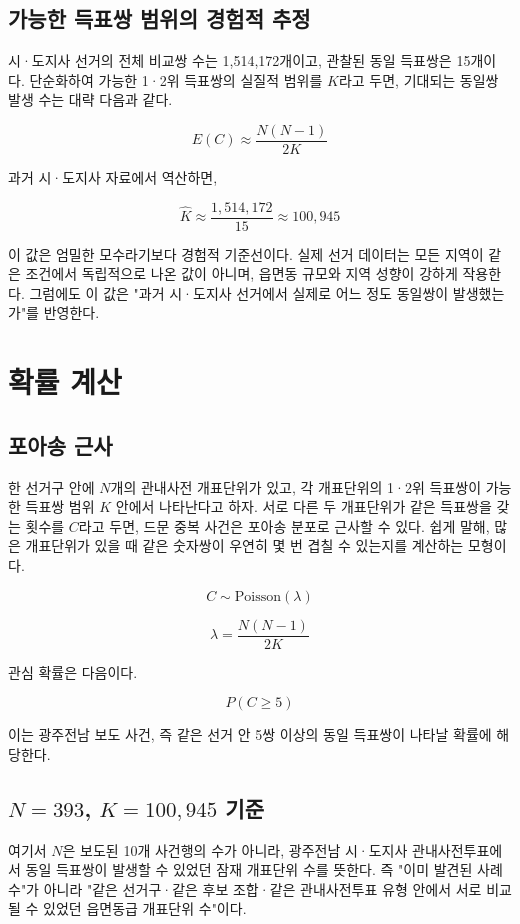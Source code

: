 \documentclass[preprint]{IEIE}
\begin{document}
\subsection{가능한 득표쌍 범위의 경험적 추정}

시·도지사 선거의 전체 비교쌍 수는 1,514,172개이고, 관찰된 동일 득표쌍은 15개이다. 단순화하여 가능한 1·2위 득표쌍의 실질적 범위를 \(K\)라고 두면, 기대되는 동일쌍 발생 수는 대략 다음과 같다.

\[
E(C) \approx \frac{N(N-1)}{2K}
\]

과거 시·도지사 자료에서 역산하면,

\[
\hat{K} \approx \frac{1,514,172}{15} \approx 100,945
\]

이 값은 엄밀한 모수라기보다 경험적 기준선이다. 실제 선거 데이터는 모든 지역이 같은 조건에서 독립적으로 나온 값이 아니며, 읍면동 규모와 지역 성향이 강하게 작용한다. 그럼에도 이 값은 "과거 시·도지사 선거에서 실제로 어느 정도 동일쌍이 발생했는가"를 반영한다.

\section{확률 계산}

\subsection{포아송 근사}

한 선거구 안에 \(N\)개의 관내사전 개표단위가 있고, 각 개표단위의 1·2위 득표쌍이 가능한 득표쌍 범위 \(K\) 안에서 나타난다고 하자. 서로 다른 두 개표단위가 같은 득표쌍을 갖는 횟수를 \(C\)라고 두면, 드문 중복 사건은 포아송 분포로 근사할 수 있다. 쉽게 말해, 많은 개표단위가 있을 때 같은 숫자쌍이 우연히 몇 번 겹칠 수 있는지를 계산하는 모형이다.

\[
C \sim \mathrm{Poisson}(\lambda)
\]

\[
\lambda = \frac{N(N-1)}{2K}
\]

관심 확률은 다음이다.

\[
P(C \geq 5)
\]

이는 광주전남 보도 사건, 즉 같은 선거 안 5쌍 이상의 동일 득표쌍이 나타날 확률에 해당한다.

\subsection{\(N=393\), \(K=100,945\) 기준}

여기서 \(N\)은 보도된 10개 사건행의 수가 아니라, 광주전남 시·도지사 관내사전투표에서 동일 득표쌍이 발생할 수 있었던 잠재 개표단위 수를 뜻한다. 즉 "이미 발견된 사례 수"가 아니라 "같은 선거구·같은 후보 조합·같은 관내사전투표 유형 안에서 서로 비교될 수 있었던 읍면동급 개표단위 수"이다.
\end{document}

